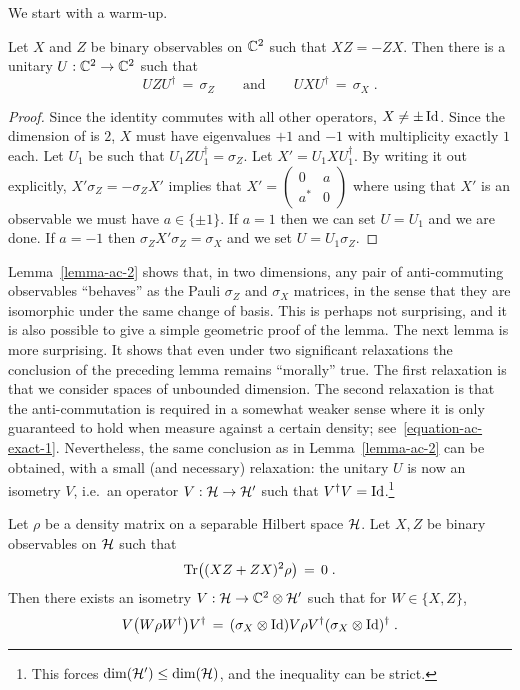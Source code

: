 We start with a warm-up. 

\begin{lemma}\label{lemma-ac-2}
Let $X$ and $Z$ be binary observables on $\mathbb{C}^2$ such that $XZ=-ZX$. Then there is a unitary  $U:\mathbb{C}^2\to\mathbb{C}^2$ such that 
 \[ U Z U^\dagger \,=\,\sigma_Z\qquad\text{and}\qquad  U X U^\dagger \,=\,\sigma_X\;.\]
\end{lemma}

\begin{proof}
Since the identity commutes with all other operators, $X\neq \pm \mathop{\rm Id}\nolimits$. Since the dimension of is $2$, $X$ must have eigenvalues $+1$ and $-1$ with multiplicity exactly $1$ each. Let $U_1$ be such that $U_1 Z U_1^\dagger = \sigma_Z$. Let $X'= U_1 X U_1^\dagger$. By writing it out explicitly, $X' \sigma_Z = -\sigma_Z X'$ implies that $X' = \begin{pmatrix} 0 & a \\ a^* & 0 \end{pmatrix}$ where using that $X'$ is an observable we must have $a\in \{\pm 1\}$. If $a=1$ then we can set $U=U_1$ and we are done. If $a=-1$ then $\sigma_Z X' \sigma_Z = \sigma_X$ and we set $U= U_1 \sigma_Z$. 
\end{proof}

Lemma~\ref{lemma-ac-2} shows that, in two dimensions, any pair of anti-commuting observables ``behaves'' as the Pauli $\sigma_Z$ and $\sigma_X$ matrices, in the sense that they are isomorphic under the same change of basis. This is perhaps not surprising, and it is also possible to give a simple geometric proof of the lemma. The next lemma is more surprising. It shows that even under two significant relaxations the conclusion of the preceding lemma remains ``morally'' true. The first relaxation is that we consider spaces of unbounded dimension. The second relaxation is that the anti-commutation is required in a somewhat weaker sense where it is only guaranteed to hold when measure against a certain density; see~\eqref{equation-ac-exact-1}. Nevertheless, the same conclusion as in Lemma~\ref{lemma-ac-2} can be obtained, with a small (and necessary) relaxation: the unitary $U$ is now an isometry $V$, i.e.\ an operator $V:\mathcal{H} \to \mathcal{H}'$ such that $V^\dagger V = \mathop{\rm Id}\nolimits$.\footnote{This forces $\dim(\mathcal{H}')\leq \dim(\mathcal{H})$, and the inequality can be strict.}

\begin{lemma}\label{lemma-ac-exact}
Let $\rho$ be a density matrix on a separable Hilbert space $\mathcal{H}$. Let $X,Z$ be binary observables on $\mathcal{H}$ such that 
\begin{equation}\label{equation-ac-exact-1}
\mathrm{Tr}\big( (XZ+ZX)^2 \rho\big)\,=\,0\;.
\end{equation}
Then there exists an isometry $V: \mathcal{H} \to \mathbb{C}^2 \otimes \mathcal{H}'$ such that for $W\in\{X,Z\}$,
\[ V \big( W\rho W^\dagger\big) V^\dagger \,=\, (\sigma_X \otimes \mathop{\rm Id}\nolimits)V\rho V^\dagger (\sigma_X \otimes \mathop{\rm Id}\nolimits)^\dagger\;.\]
\end{lemma}

